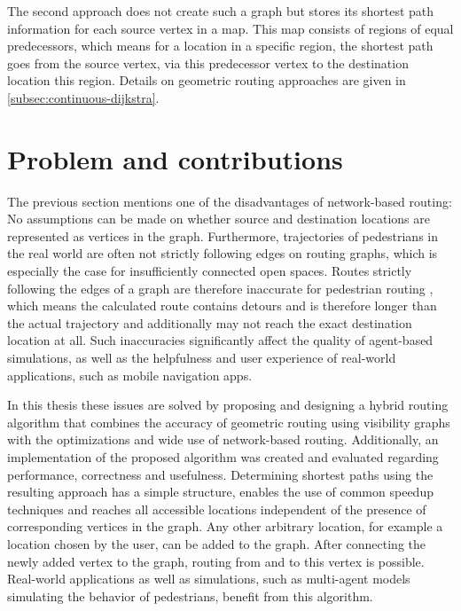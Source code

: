 	The second approach does not create such a graph but stores its shortest path information for each source vertex in a map.
	This map consists of regions of equal predecessors, which means for a location in a specific region, the shortest path goes from the source vertex, via this predecessor vertex to the destination location this region.
	Details on geometric routing approaches are given in \cref{subsec:continuous-dijkstra}.
	
\section{Problem and contributions}

	The previous section mentions one of the disadvantages of network-based routing:
	No assumptions can be made on whether source and destination locations are represented as vertices in the graph.
	Furthermore, trajectories of pedestrians in the real world are often not strictly following edges on routing graphs, which is especially the case for insufficiently connected open spaces.
	Routes strictly following the edges of a graph are therefore inaccurate for pedestrian routing \cite{graser-osm-open-spaces}, which means the calculated route contains detours and is therefore longer than the actual trajectory and additionally may not reach the exact destination location at all.
	Such inaccuracies significantly affect the quality of agent-based simulations, as well as the helpfulness and user experience of real-world applications, such as mobile navigation apps.

	In this thesis these issues are solved by proposing and designing a hybrid routing algorithm that combines the accuracy of geometric routing using visibility graphs with the optimizations and wide use of network-based routing.
	Additionally, an implementation of the proposed algorithm was created and evaluated regarding performance, correctness and usefulness.
	Determining shortest paths using the resulting approach has a simple structure, enables the use of common speedup techniques and reaches all accessible locations independent of the presence of corresponding vertices in the graph.
	Any other arbitrary location, for example a location chosen by the user, can be added to the graph.
	After connecting the newly added vertex to the graph, routing from and to this vertex is possible.
	Real-world applications as well as simulations, such as multi-agent models simulating the behavior of pedestrians, benefit from this algorithm.
	

